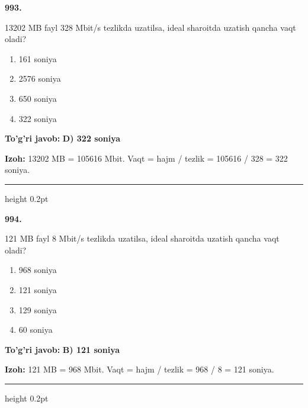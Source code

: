\documentclass[10pt,a4paper,oneside]{article}
\begin{document}
\noindent\textbf{\color{ink}993.}
\par
13202 MB fayl 328 Mbit/s tezlikda uzatilsa, ideal sharoitda uzatish qancha vaqt oladi?
\begin{enumerate}[label=\Alph*),leftmargin=9mm]
\item 161 soniya
\item 2576 soniya
\item 650 soniya
\item 322 soniya
\end{enumerate}
\begin{tcolorbox}[enhanced,breakable,colback=teal!4,colframe=teal!50!black,boxrule=0.5pt,arc=1.1mm,left=3mm,right=3mm,top=1.7mm,bottom=1.7mm,before skip=2mm,after skip=2mm]
\textbf{\color{teal}To'g'ri javob:} \textbf{D) 322 soniya}
\par\smallskip
\textbf{Izoh:} 13202 MB = 105616 Mbit. Vaqt = hajm / tezlik = 105616 / 328 = 322 soniya.
\end{tcolorbox}
\vspace{2mm}\hrule height 0.2pt \vspace{3mm}

\noindent\textbf{\color{ink}994.}
\par
121 MB fayl 8 Mbit/s tezlikda uzatilsa, ideal sharoitda uzatish qancha vaqt oladi?
\begin{enumerate}[label=\Alph*),leftmargin=9mm]
\item 968 soniya
\item 121 soniya
\item 129 soniya
\item 60 soniya
\end{enumerate}
\begin{tcolorbox}[enhanced,breakable,colback=teal!4,colframe=teal!50!black,boxrule=0.5pt,arc=1.1mm,left=3mm,right=3mm,top=1.7mm,bottom=1.7mm,before skip=2mm,after skip=2mm]
\textbf{\color{teal}To'g'ri javob:} \textbf{B) 121 soniya}
\par\smallskip
\textbf{Izoh:} 121 MB = 968 Mbit. Vaqt = hajm / tezlik = 968 / 8 = 121 soniya.
\end{tcolorbox}
\vspace{2mm}\hrule height 0.2pt \vspace{3mm}
\end{document}
